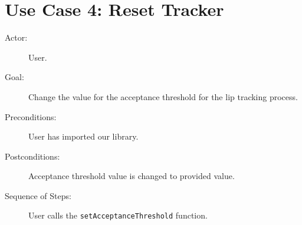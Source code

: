 \section{Use Case 4: Reset Tracker}

\begin{description}
	\item[Actor:] User.
	\item[Goal:] Change the value for the acceptance threshold for the lip tracking process.
	\item[Preconditions:] User has imported our library.
	\item[Postconditions:] Acceptance threshold value is changed to provided value.
	\item[Sequence of Steps:] User calls the \texttt{setAcceptanceThreshold} function.
\end{description}